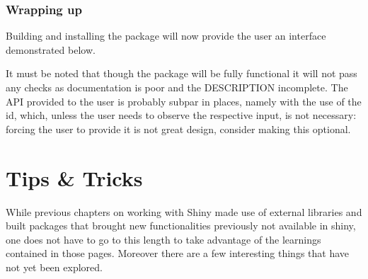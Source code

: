 \documentclass[
]{krantz}
\makeatletter
\newenvironment{Shaded}{\begin{snugshade}}{\end{snugshade}}
\newcommand{\ControlFlowTok}[1]{\textcolor[rgb]{0.27,0.27,0.27}{\textbf{#1}}}
\newcommand{\KeywordTok}[1]{\textcolor[rgb]{0.27,0.27,0.27}{\textbf{#1}}}
\newcommand{\NormalTok}[1]{#1}
\newcommand{\OperatorTok}[1]{\textcolor[rgb]{0.43,0.43,0.43}{\textbf{#1}}}
\newcommand{\StringTok}[1]{\textcolor[rgb]{0.5,0.5,0.5}{#1}}
\newenvironment{kframe}{%
\medskip{}
\setlength{\fboxsep}{.8em}
 \def\at@end@of@kframe{}%
 \ifinner\ifhmode%
  \def\at@end@of@kframe{\end{minipage}}%
  \begin{minipage}{\columnwidth}%
 \fi\fi%
 \def\FrameCommand##1{\hskip\@totalleftmargin \hskip-\fboxsep
 \colorbox{shadecolor}{##1}\hskip-\fboxsep
     \hskip-\linewidth \hskip-\@totalleftmargin \hskip\columnwidth}%
 \MakeFramed {\advance\hsize-\width
   \@totalleftmargin\z@ \linewidth\hsize
   \@setminipage}}%
 {\par\unskip\endMakeFramed%
 \at@end@of@kframe}
\renewenvironment{Shaded}{\begin{kframe}}{\end{kframe}}
\makeatother
\begin{document}
\hypertarget{shiny-complete-pkg-conclude}{%
\subsection{Wrapping up}\label{shiny-complete-pkg-conclude}}

Building and installing the package will now provide the user an interface demonstrated below.

\begin{Shaded}
\end{Shaded}

It must be noted that though the package will be fully functional it will not pass any checks as documentation is poor and the DESCRIPTION incomplete. The API provided to the user is probably subpar in places, namely with the use of the id, which, unless the user needs to observe the respective input, is not necessary: forcing the user to provide it is not great design, consider making this optional.

\hypertarget{shiny-tips}{%
\chapter{Tips \& Tricks}\label{shiny-tips}}

While previous chapters on working with Shiny made use of external libraries and built packages that brought new functionalities previously not available in shiny, one does not have to go to this length to take advantage of the learnings contained in those pages. Moreover there are a few interesting things that have not yet been explored.
\end{document}
